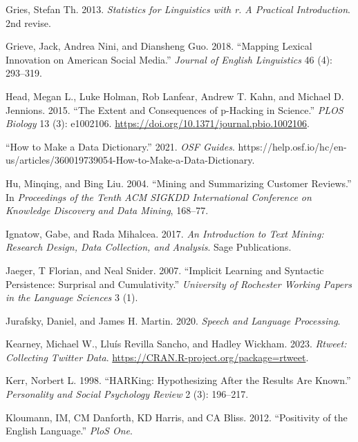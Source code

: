 \documentclass[
  letterpaper,
]{scrbook}
\newlength{\cslhangindent}
\newlength{\cslentryspacingunit} %
\newenvironment{CSLReferences}[2] %
 {%
  \setlength{\parindent}{0pt}
  \ifodd #1
  \let\oldpar\par
  \def\par{\hangindent=\cslhangindent\oldpar}
  \fi
  \setlength{\parskip}{#2\cslentryspacingunit}
 }%
 {}
\begin{document}
\begin{CSLReferences}{1}{0}
\leavevmode{}%
Gries, Stefan Th. 2013. \emph{Statistics for Linguistics with r. A
Practical Introduction}. 2nd revise.

\leavevmode{}%
Grieve, Jack, Andrea Nini, and Diansheng Guo. 2018. {``Mapping Lexical
Innovation on American Social Media.''} \emph{Journal of English
Linguistics} 46 (4): 293--319.

\leavevmode{}%
Head, Megan L., Luke Holman, Rob Lanfear, Andrew T. Kahn, and Michael D.
Jennions. 2015. {``The Extent and Consequences of p-Hacking in
Science.''} \emph{PLOS Biology} 13 (3): e1002106.
\url{https://doi.org/10.1371/journal.pbio.1002106}.

\leavevmode{}%
{``How to Make a Data Dictionary.''} 2021. \emph{OSF Guides}.
https://help.osf.io/hc/en-us/articles/360019739054-How-to-Make-a-Data-Dictionary.

\leavevmode{}%
Hu, Minqing, and Bing Liu. 2004. {``Mining and Summarizing Customer
Reviews.''} In \emph{Proceedings of the Tenth ACM SIGKDD International
Conference on Knowledge Discovery and Data Mining}, 168--77.

\leavevmode{}%
Ignatow, Gabe, and Rada Mihalcea. 2017. \emph{An Introduction to Text
Mining: Research Design, Data Collection, and Analysis}. Sage
Publications.

\leavevmode{}%
Jaeger, T Florian, and Neal Snider. 2007. {``Implicit Learning and
Syntactic Persistence: Surprisal and Cumulativity.''} \emph{University
of Rochester Working Papers in the Language Sciences} 3 (1).

\leavevmode{}%
Jurafsky, Daniel, and James H. Martin. 2020. \emph{Speech and Language
Processing}.

\leavevmode{}%
Kearney, Michael W., Lluís Revilla Sancho, and Hadley Wickham. 2023.
\emph{Rtweet: Collecting Twitter Data}.
\url{https://CRAN.R-project.org/package=rtweet}.

\leavevmode{}%
Kerr, Norbert L. 1998. {``HARKing: Hypothesizing After the Results Are
Known.''} \emph{Personality and Social Psychology Review} 2 (3):
196--217.

\leavevmode{}%
Kloumann, IM, CM Danforth, KD Harris, and CA Bliss. 2012. {``Positivity
of the English Language.''} \emph{PloS One}.


\end{CSLReferences}
\end{document}
